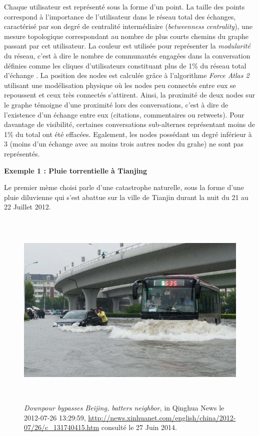 Chaque utilisateur est représenté sous la forme d{\textquoteright}un point. La taille des points correspond à l{\textquoteright}importance de l{\textquoteright}utilisateur dans le réseau total des échanges, caractérisé par son degré de centralité intermédiaire (\textit{betweenness centrality}), une mesure topologique correspondant au nombre de plus courts chemins du graphe passant par cet utilisateur. La couleur est utilisée pour représenter la \textit{modularité }du réseau, c{\textquoteright}est à dire le nombre de communautés engagées dans la conversation définies comme les cliques d{\textquoteright}utilisateurs constituant plus de 1\% du réseau total d{\textquoteright}échange \citep{Blondel2008}. La position des nodes est calculée gr\^ace à l{\textquoteright}algorithme \textit{Force Atlas 2} \citep{Bastian2009} utilisant une modélisation physique o\`u les nodes peu connectés entre eux se repoussent et ceux très connectés s{\textquoteright}attirent. Ainsi, la proximité de deux nodes sur le graphe témoigne d{\textquoteright}une proximité lors des conversations, c{\textquoteright}est à dire de l{\textquoteright}existence d{\textquoteright}un échange entre eux (citations, commentaires ou retweets). Pour davantage de visibilité, certaines conversations sub-alternes représentant moins de 1\% du total ont été effacées. Egalement, les nodes possédant un degré inférieur à 3 (moins d{\textquoteright}un échange avec au moins trois autres nodes du grahe) ne sont pas représentés.


\textbf{Exemple 1 : Pluie torrentielle à Tianjing}

Le premier mème choisi parle d{\textquoteright}une catastrophe naturelle, sous la forme d{\textquoteright}une pluie diluvienne qui s{\textquoteright}est abattue sur la ville de Tianjin durant la nuit du 21 au 22 Juillet 2012.

\begin{figure}
    \centering
    \includegraphics[width=6.0114in,height=3.7894in]{figures/chap3/chapitre3-img16.jpg}
    \caption[Photo de Tianjin durant la pluie torentielle en Juillet 2012]{\textit{Downpour bypasses Beijing, batters neighbor, }in Qinghua News le 2012-07-26 13:29:59, \url{http://news.xinhuanet.com/english/china/2012-07/26/c_131740415.htm} consulté le 27 Juin 2014.}
\end{figure}

